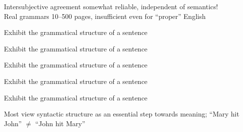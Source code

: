 \documentclass{article}
\begin{document}
\begin{huge}
Intersubjective agreement somewhat reliable, independent of semantics!\\
Real grammars 10--500 pages, insufficient even for ``proper'' English




Exhibit the grammatical structure of a sentence

\vspace*{0.2in}

\textwidth
{}


Exhibit the grammatical structure of a sentence

\vspace*{0.2in}

\textwidth
{}


Exhibit the grammatical structure of a sentence

\vspace*{0.2in}

\textwidth
{}


Exhibit the grammatical structure of a sentence

\vspace*{0.2in}

\textwidth
{}


Exhibit the grammatical structure of a sentence

\vspace*{0.2in}

\textwidth
{}


Most view syntactic structure as an essential step towards meaning;\al
``Mary hit John'' $\neq$ ``John hit Mary''


\end{huge}
\end{document}
